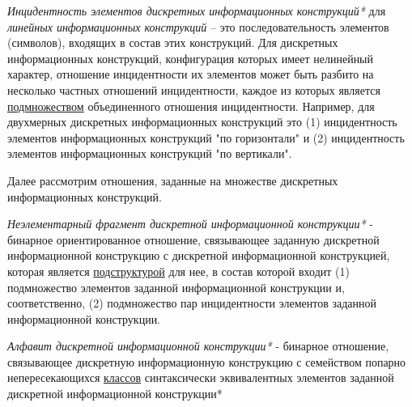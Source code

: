 \textit{Инцидентность элементов дискретных информационных конструкций*} для \textit{линейных информационных конструкций} -- это последовательность элементов (символов), входящих в состав этих конструкций.
Для дискретных информационных конструкций, конфигурация которых имеет нелинейный характер, отношение инцидентности их элементов может быть разбито на несколько частных отношений инцидентности, каждое из которых является \underline{подмножеством} объединенного отношения инцидентности.
Например, для двухмерных дискретных информационных конструкций это (1) инцидентность элементов информационных конструкций "по горизонтали"{} и (2) инцидентность элементов информационных конструкций "по вертикали"{}.

Далее рассмотрим отношения, заданные на множестве дискретных информационных конструкций.

\begin{SCn}


\end{SCn}

\textit{Неэлементарный фрагмент дискретной информационной конструкции*} - бинарное ориентированное отношение, связывающее заданную дискретной информационной конструкцию с дискретной информационной конструкцией, которая является \underline{подструктурой} для нее, в состав которой входит (1) подмножество элементов заданной информационной конструкции и, соответственно, (2) подмножество пар инцидентности элементов заданной информационной конструкции.

\textit{Алфавит дискретной информационной конструкции*} - бинарное отношение, связывающее дискретную информационную конструкцию с семейством попарно непересекающихся \underline{классов} синтаксически эквивалентных элементов заданной дискретной информационной конструкции*

